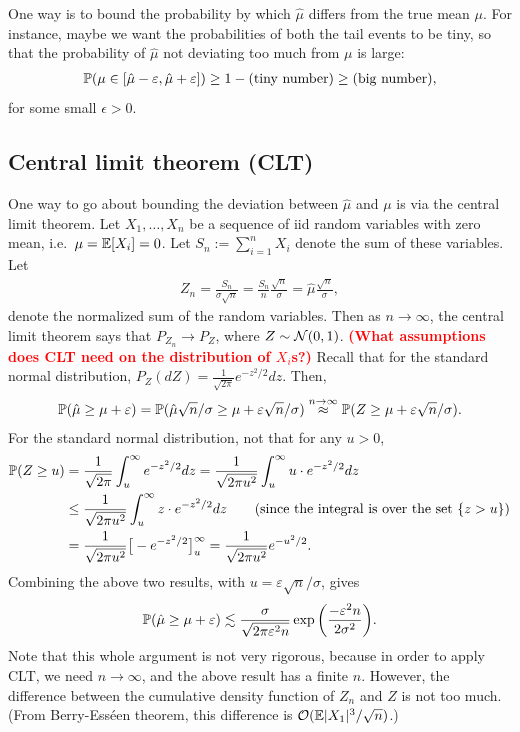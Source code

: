 \documentclass[twoside]{article}
\begin{document}
One way is to bound the probability by which $\hat \mu$ differs from the true mean $\mu$. For instance, maybe we want the probabilities of both the tail events to be tiny, so that the probability of $\hat \mu$ not deviating too much from $\mu$ is large:
\begin{align*}
  \mathbb{P}(\mu \in [\hat \mu - \varepsilon, \hat \mu + \varepsilon]) \geq 1 - (\text{tiny number}) \geq (\text{big number}),
\end{align*}
for some small $\epsilon > 0$.

\subsection*{Central limit theorem (CLT)}
One way to go about bounding the deviation between $\hat \mu$ and $\mu$ is via the central limit theorem. Let $X_1, \ldots, X_n$ be a sequence of iid random variables with zero mean, i.e.\ $\mu = \mathbb{E}[X_i] = 0$. Let $S_n := \sum_{i=1}^n X_i$ denote the sum of these variables. Let 
\begin{align*}
  Z_n = \frac{S_n}{\sigma \sqrt n} = \frac{S_n}{n} \frac{\sqrt n}{\sigma} = \hat \mu \frac{\sqrt n}{\sigma},
\end{align*}
denote the normalized sum of the random variables. Then as $n \to \infty$, the central limit theorem says that $P_{Z_n} \to P_Z$, where $Z \sim \mathcal{N}(0, 1)$. \textbf{\textcolor{red}{(What assumptions does CLT need on the distribution of $X_i$s?)}} Recall that for the standard normal distribution, $P_Z(dZ) = \frac{1}{\sqrt{2 \pi}} e^{-z^2/2} dz$. Then,
\begin{align*}
  \mathbb{P}(\hat \mu \geq \mu + \varepsilon) = \mathbb{P}( \hat \mu \sqrt n / \sigma \geq \mu + \varepsilon \sqrt n / \sigma ) \stackrel{n \to \infty}{\approx} \mathbb{P}(Z \geq \mu + \varepsilon \sqrt n / \sigma).
\end{align*}
For the standard normal distribution, not that for any $u > 0$,
\begin{align*}
  \PP(Z \geq u) &= \frac{1}{\sqrt{2 \pi}} \int_{u}^\infty e^{-z^2/2} dz = \frac{1}{\sqrt{2 \pi u^2}} \int_{u}^\infty u \cdot e^{-z^2/2} dz \\
  &\leq \frac{1}{\sqrt{2 \pi u^2}} \int_{u}^\infty z \cdot e^{-z^2/2} dz \tag{since the integral is over the set $\{z > u\}$}\\
  &= \frac{1}{\sqrt{2 \pi u^2}} \big[ - e^{-z^2/2} \big]_u^\infty = \frac{1}{\sqrt{2 \pi u^2}} e^{-u^2/2}.
\end{align*}
Combining the above two results, with $u = \varepsilon \sqrt n / \sigma$, gives 
\begin{align*}
  \mathbb{P}( \hat \mu \geq \mu + \varepsilon) \lesssim \frac{\sigma}{\sqrt{2 \pi \varepsilon^2 n}} \exp \bigg( \frac{-\varepsilon^2 n}{2 \sigma^2} \bigg).
\end{align*}
Note that this whole argument is not very rigorous, because in order to apply CLT, we need $n \to \infty$, and the above result has a finite $n$. However, the difference between the cumulative density function of $Z_n$ and $Z$ is not too much. (From Berry-Ess\'{e}en theorem, this difference is $\mathcal{O}(\mathbb{E} |X_1|^3/\sqrt n)$.)
\end{document}
